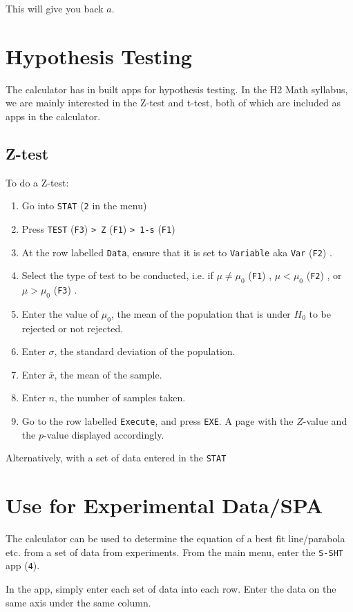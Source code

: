 \documentclass[a5paper]{memoir}
\def\code#1{\texttt{#1}}
\def\Fone{(\code{F1}) }
\def\Ftwo{(\code{F2}) }
\def\Fthree{(\code{F3}) }
\begin{document}
This will give you back $a$.

\section{Hypothesis Testing}
The calculator has in built apps for hypothesis testing. In the H2 Math syllabus, we are mainly interested in the Z-test and t-test, both of which are included as apps in the calculator.

\subsection{Z-test}
To do a Z-test:

\begin{enumerate}
	\item Go into \code{STAT} (\code{2} in the menu)
	\item Press \code{TEST} \Fthree \code{> Z} \Fone \code{> 1-s} \Fone
	\item At the row labelled \code{Data}, ensure that it is set to \code{Variable} aka \code{Var} \Ftwo.
	\item Select the type of test to be conducted, i.e. if $\mu \neq \mu_0$ \Fone, $\mu < \mu_0$ \Ftwo, or $\mu > \mu_0$ \Fthree.
	\item Enter the value of $\mu_0$, the mean of the population that is under $H_0$ to be rejected or not rejected.
	\item Enter $\sigma$, the standard deviation of the population.
	\item Enter $\bar{x}$, the mean of the sample.
	\item Enter $n$, the number of samples taken.
	\item Go to the row labelled \code{Execute}, and press \code{EXE}. A page with the $Z$-value and the $p$-value displayed accordingly.
\end{enumerate}

Alternatively, with a set of data entered in the \code{STAT}


\section{Use for Experimental Data/SPA}
The calculator can be used to determine the equation of a best fit line/parabola etc. from a set of data from experiments. From the main menu, enter the \code{S-SHT} app (\code{4}). 

In the app, simply enter each set of data into each row. Enter the data on the same axis under the same column.
\end{document}
